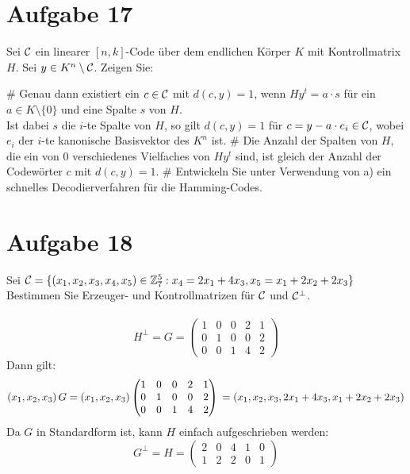 
\setcounter{MaxMatrixCols}{20}

\section*{Aufgabe 17}
Sei $\mathcal{C}$ ein linearer $[n,k]$-Code über dem endlichen Körper $K$ mit Kontrollmatrix $H$.
Sei $y \in K^n \setminus \mathcal{C}$. Zeigen Sie:
\begin{myList}
#
Genau dann existiert ein $c \in \mathcal{C}$ mit $d(c,y)=1$, wenn $Hy^t = a \cdot s$ für ein $a \in K \setminus \lbrace 0 \rbrace$ und eine Spalte $s$ von $H$.\\
Ist dabei $s$ die $i$-te Spalte von $H$, so gilt $d(c,y) = 1$ für $c = y -a\cdot e_i \in \mathcal{C}$, wobei $e_i$ der $i$-te kanonische Basisvektor des $K^n$ ist.
#
Die Anzahl der Spalten von $H$, die ein von 0 verschiedenes Vielfaches von $Hy^t$ sind, ist gleich der Anzahl der Codewörter $c$ mit $d(c,y) = 1$.
#
Entwickeln Sie unter Verwendung von a) ein schnelles Decodierverfahren für die Hamming-Codes.
\end{myList}
\section*{Aufgabe 18}
Sei $\mathcal{C} = \lbrace (x_1,x_2,x_3,x_4,x_5) \in \mathbb{Z}^5_7 : x_4 = 2x_1 + 4x_3, x_5 = x_1 + 2x_2 + 2x_3 \rbrace$
Bestimmen Sie Erzeuger- und Kontrollmatrizen für $\mathcal{C}$ und $\mathcal{C}^\bot$.\\\\
\begin{equation*}
  H^\bot = G =
  \begin{pmatrix}
  1 & 0 & 0 & 2 & 1 \\
  0 & 1 & 0 & 0 & 2 \\
  0 & 0 & 1 & 4 & 2 
  \end{pmatrix}
\end{equation*}
Dann gilt: 
\begin{equation*}
  \left( x_1, x_2, x_3 \right) G\\
= \left( x_1, x_2, x_3 \right)
  \begin{pmatrix}
  1 & 0 & 0 & 2 & 1 \\
  0 & 1 & 0 & 0 & 2 \\
  0 & 0 & 1 & 4 & 2 
  \end{pmatrix}\\
= \left( x_1, x_2, x_3, 2x_1+4x_3, x_1+2x_2+2x_3 \right)
\end{equation*}
Da $G$ in Standardform ist, kann $H$ einfach aufgeschrieben werden:
\begin{equation*}
  G^\bot = H = 
  \begin{pmatrix}
  2 & 0 & 4 & 1 & 0 \\
  1 & 2 & 2 & 0 & 1 
  \end{pmatrix}
\end{equation*}
